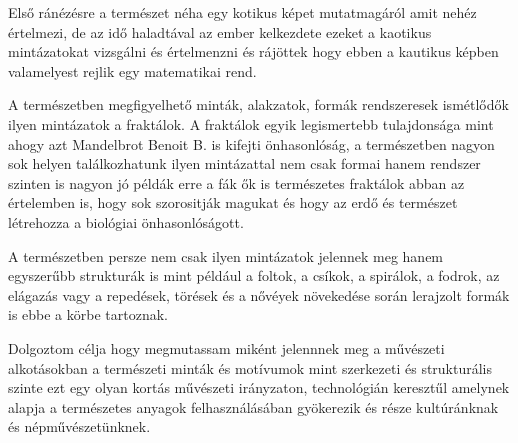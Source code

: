 \documentclass[fontsize=12pt, appendixprefix=true]{scrreprt}
\begin{document}
Első ránézésre a természet néha egy kotikus képet mutatmagáról amit nehéz értelmezi, de az idő haladtával az ember kelkezdete ezeket a kaotikus mintázatokat vizsgálni és értelmenzni és rájöttek hogy ebben a kautikus képben valamelyest rejlik egy matematikai rend.

A természetben megfigyelhető minták, alakzatok, formák rendszeresek ismétlődők ilyen mintázatok a fraktálok. A fraktálok egyik legismertebb tulajdonsága mint ahogy azt Mandelbrot Benoit B. is kifejti \cite{mandelbrot1982fractal} önhasonlóság, a természetben nagyon sok helyen találkozhatunk ilyen mintázattal nem csak formai hanem rendszer szinten is nagyon jó példák erre a fák ők is természetes fraktálok abban az értelemben is, hogy sok szorositják magukat és hogy az erdő és természet létrehozza a biológiai önhasonlóságott. 

A természetben persze nem csak ilyen mintázatok jelennek meg hanem egyszerűbb strukturák is mint például a foltok, a csíkok, a spirálok, a fodrok, az elágazás vagy a repedések, törések és a nővéyek növekedése során lerajzolt formák is ebbe a körbe tartoznak.

Dolgoztom célja hogy megmutassam miként jelennnek meg a művészeti alkotásokban a természeti minták és motívumok mint szerkezeti és strukturális szinte ezt egy olyan kortás művészeti irányzaton, technológián keresztűl amelynek alapja a természetes anyagok felhasználásában gyökerezik és része kultúránknak és népművészetünknek.
\end{document}
